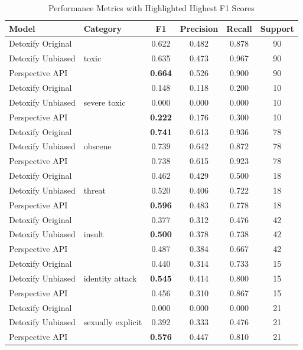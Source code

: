 \begin{table}[h!]
\centering
\begin{tabular}{|l|l|c|c|c|c|}
\hline
\textbf{Model} & \textbf{Category} & \textbf{F1} & \textbf{Precision} & \textbf{Recall} & \textbf{Support} \\
\hline
Detoxify Original & & 0.622 & 0.482 & 0.878 & 90 \\
Detoxify Unbiased & toxic & 0.635 & 0.473 & 0.967 & 90 \\
Perspective API & & \textbf{0.664} & 0.526 & 0.900 & 90 \\
\hline
Detoxify Original & & 0.148 & 0.118 & 0.200 & 10 \\
Detoxify Unbiased & severe toxic & 0.000 & 0.000 & 0.000 & 10 \\
Perspective API & & \textbf{0.222} & 0.176 & 0.300 & 10 \\
\hline
Detoxify Original & & \textbf{0.741} & 0.613 & 0.936 & 78 \\
Detoxify Unbiased & obscene & 0.739 & 0.642 & 0.872 & 78 \\
Perspective API & & 0.738 & 0.615 & 0.923 & 78 \\
\hline
Detoxify Original & & 0.462 & 0.429 & 0.500 & 18 \\
Detoxify Unbiased & threat & 0.520 & 0.406 & 0.722 & 18 \\
Perspective API & & \textbf{0.596} & 0.483 & 0.778 & 18 \\
\hline
Detoxify Original & & 0.377 & 0.312 & 0.476 & 42 \\
Detoxify Unbiased & insult & \textbf{0.500} & 0.378 & 0.738 & 42 \\
Perspective API & & 0.487 & 0.384 & 0.667 & 42 \\
\hline
Detoxify Original & & 0.440 & 0.314 & 0.733 & 15 \\
Detoxify Unbiased & identity attack & \textbf{0.545} & 0.414 & 0.800 & 15 \\
Perspective API & & 0.456 & 0.310 & 0.867 & 15 \\
\hline
Detoxify Original & & 0.000 & 0.000 & 0.000 & 21 \\
Detoxify Unbiased & sexually explicit & 0.392 & 0.333 & 0.476 & 21 \\
Perspective API & & \textbf{0.576} & 0.447 & 0.810 & 21 \\
\hline
\end{tabular}
\caption{Performance Metrics with Highlighted Highest F1 Scores}
\end{table}

